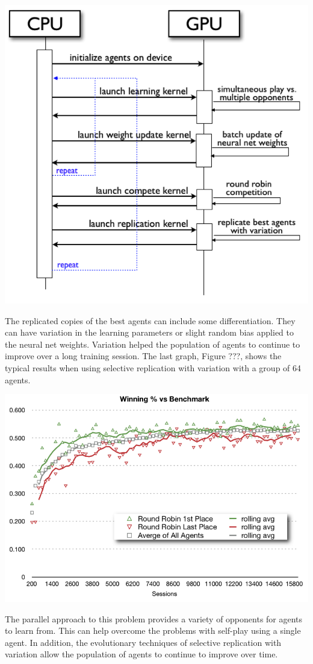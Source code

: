 \documentclass[11pt]{article} %
\begin{document}
\center
\includegraphics[scale=0.8]{fig19}
\begin{flushleft}

The replicated copies of the best agents can include some differentiation.  They can have variation in the learning parameters or slight random bias applied to the neural net weights.  Variation helped the population of agents to continue to improve over a long training session.  The last graph, Figure ???, shows the typical results when using selective replication with variation with a group of 64 agents.  

\end{flushleft}
\center
\includegraphics[scale=0.8]{fig20}
\begin{flushleft}


The parallel approach to this problem provides a variety of opponents for agents to learn from.  This can help overcome the problems with self-play using a single agent.  In addition, the evolutionary techniques of selective replication with variation allow the population of agents to continue to improve over time.

\end{flushleft}
\end{document}
